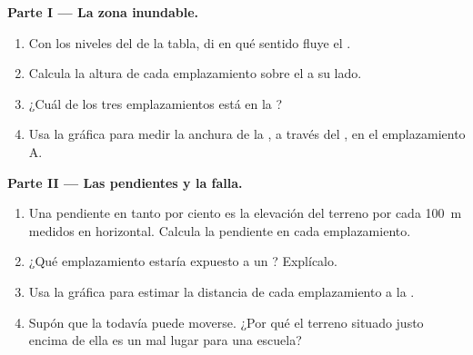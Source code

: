 \begin{problem}
\noindent\textbf{Parte I --- La zona inundable.}\par\nopagebreak
\begin{enumerate}[beginpenalty=10000]
  \item Con los niveles del  de la tabla, di en qué sentido fluye el
        .
  \item Calcula la altura de cada emplazamiento sobre el  a su lado.
  \item ¿Cuál de los tres emplazamientos está en la ?
  \item Usa la  gráfica para medir la anchura de la ,
        a través del , en el emplazamiento A.
\end{enumerate}

\noindent\textbf{Parte II --- Las pendientes y la falla.}\par\nopagebreak
\begin{enumerate}[resume, beginpenalty=10000]
  \item Una pendiente en tanto por ciento es la elevación del terreno por
        cada \qty{100}{m} medidos en horizontal. Calcula la pendiente en
        cada emplazamiento.
  \item ¿Qué emplazamiento estaría expuesto a un ?
        Explícalo.
  \item Usa la  gráfica para estimar la distancia de cada
        emplazamiento a la .
  \item Supón que la  todavía puede moverse. ¿Por qué el terreno
        situado justo encima de ella es un mal lugar para una escuela?
\end{enumerate}


\end{problem}
